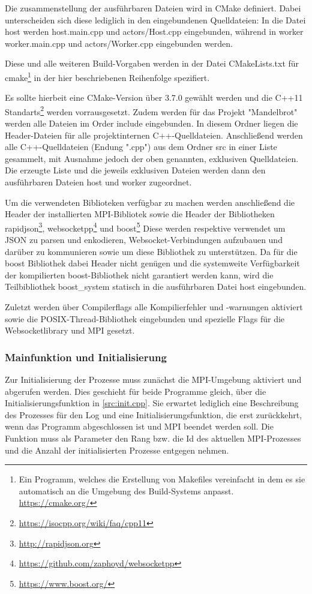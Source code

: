 Die zusammenstellung der ausführbaren Dateien wird in CMake definiert.
Dabei unterscheiden sich diese lediglich in den eingebundenen Quelldateien:
In die Datei host werden host.main.cpp und actors/Host.cpp eingebunden, während
in worker worker.main.cpp und actors/Worker.cpp eingebunden werden.

Diese und alle weiteren Build-Vorgaben werden in der Datei CMakeLists.txt für 
cmake\footnote{Ein Programm, welches die Erstellung von Makefiles vereinfacht in dem es sie automatisch an die Umgebung des Build-Systems anpasst. \url{https://cmake.org/}}
in der hier beschriebenen Reihenfolge spezifiert.

Es sollte hierbeit eine CMake-Version über 3.7.0 gewählt werden und die C++11 Standarts\footnote{\url{https://isocpp.org/wiki/faq/cpp11}} werden vorrausgesetzt.
Zudem werden für das Projekt "Mandelbrot" werden alle Dateien im Order include eingebunden.
In diesem Ordner liegen die Header-Dateien für alle projektinternen C++-Quelldateien.
Anschließend werden alle C++-Quelldateien (Endung ".cpp") aus dem Ordner src in einer Liste gesammelt, mit Ausnahme jedoch der oben genannten, exklusiven Quelldateien.
Die erzeugte Liste und die jeweils exklusiven Dateien werden dann den ausführbaren Dateien host und worker zugeordnet.

Um die verwendeten Biblioteken verfügbar zu machen werden anschließend die Header der installierten MPI-Bibliotek
sowie die Header der Bibliotheken rapidjson\footnote{\url{http://rapidjson.org}}, websocketpp\footnote{\url{https://github.com/zaphoyd/websocketpp}} und boost\footnote{\url{https://www.boost.org/}}
Diese werden respektive verwendet um JSON zu parsen und enkodieren, Websocket-Verbindungen aufzubauen und darüber zu kommunieren sowie um diese Bibliothek zu unterstützen.
Da für die boost Bibliothek dabei Header nicht genügen und die systemweite Verfügbarkeit der kompilierten boost-Bibliothek nicht garantiert werden kann, wird die Teilbibliothek boost\_system statisch
in die ausführbaren Datei host eingebunden.

Zuletzt werden über Compilerflags alle Kompilierfehler und -warnungen aktiviert sowie die POSIX-Thread-Bibliothek eingebunden
und spezielle Flags für die Websocketlibrary und MPI gesetzt.

\subsubsection{Mainfunktion und Initialisierung}

Zur Initialisierung der Prozesse muss zunächst die MPI-Umgebung aktiviert und abgerufen werden.
Dies geschieht für beide Programme gleich, über die Initialisierungsfunktion in \autoref{src:init.cpp}.
Sie erwartet lediglich eine Beschreibung des Prozesses für den Log und eine Initialisierungsfunktion,
die erst zurückkehrt, wenn das Programm abgeschlossen ist und MPI beendet werden soll.
Die Funktion muss als Parameter den Rang bzw. die Id des aktuellen MPI-Prozesses und die Anzahl der initialisierten
Prozesse entgegen nehmen.

